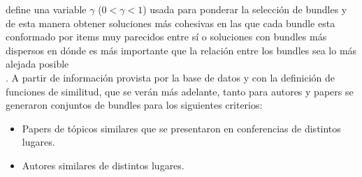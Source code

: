 define una variable \texttt{$\gamma$} ($0 < \gamma < 1$) usada para ponderar la selección de 
bundles y de esta manera obtener soluciones más cohesivas en las que cada bundle esta conformado 
por items muy parecidos entre sí o soluciones con bundles más dispersos en dónde es más importante 
que la relación entre los bundles sea lo más alejada posible\\.
A partir de información provista por la base de datos y con la definición de funciones de 
similitud, que se verán más adelante, tanto para autores y papers se generaron conjuntos de bundles 
para los siguientes criterios:
\begin{itemize}
 \item Papers de tópicos similares que se presentaron en conferencias de 
distintos lugares.
 \item Autores similares de distintos lugares.
\end{itemize}